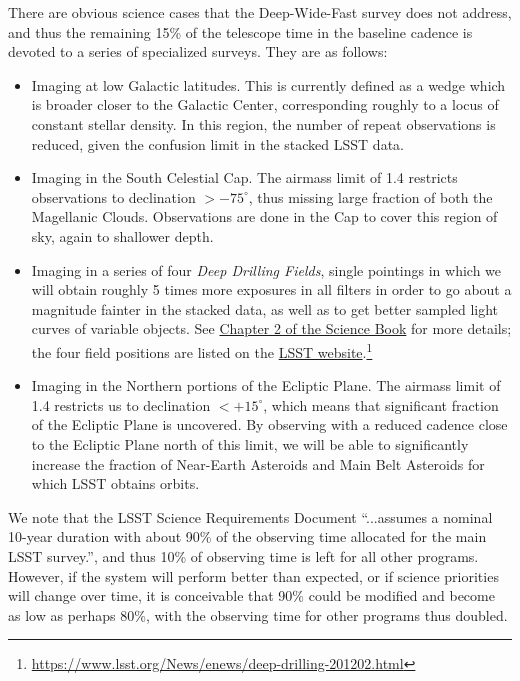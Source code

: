 There are obvious science cases that the Deep-Wide-Fast survey does
not address, and thus the remaining 15\% of the telescope time in the
baseline cadence is devoted to a series of specialized surveys.  They
are as follows:
\begin{itemize}
\item Imaging at low Galactic latitudes.  This is currently defined as
  a wedge which is broader closer to the Galactic Center,
  corresponding roughly to a locus of constant stellar density.  In
  this region, the number of repeat observations is reduced, given the
  confusion limit in the stacked LSST data.
\item Imaging in the South Celestial Cap.  The airmass limit of 1.4
  restricts observations to declination $> -75^\circ$, thus missing
  large fraction of both the Magellanic Clouds.
  Observations are done in the Cap to cover this region of sky, again
  to shallower depth.
\item Imaging in a series of four {\em Deep Drilling Fields}, single
  pointings in which
  we will obtain roughly 5 times more exposures in all
  filters in order to go about a magnitude fainter in the stacked
  data, as well as to get better sampled light curves of variable
  objects. See \href{https://www.lsst.org/sites/default/files/docs/sciencebook/SB_2.pdf}{Chapter 2 of the Science Book} \citep{} for more details; the four field positions are listed on the \href{https://www.lsst.org/News/enews/deep-drilling-201202.html}{LSST website}.\footnote{\url{https://www.lsst.org/News/enews/deep-drilling-201202.html}}
\item Imaging in the Northern portions of the Ecliptic Plane.  The
  airmass limit of 1.4 restricts us to declination $< +15^\circ$, which
  means that significant fraction of the Ecliptic Plane
  is uncovered.  By observing with a reduced cadence close to the
  Ecliptic Plane north of this limit, we will be able to significantly
  increase the fraction of Near-Earth Asteroids and Main Belt
  Asteroids for which LSST obtains orbits.
\end{itemize}

We note that the LSST Science Requirements Document ``...assumes a nominal
10-year duration with about 90\% of the observing time allocated for the main
LSST survey.'', and thus 10\% of observing time is left for all other programs.
However, if the system will perform better than expected, or if science priorities
will change over time, it is conceivable that 90\% could be modified and become
as low as perhaps 80\%, with the observing time for other programs thus doubled.

